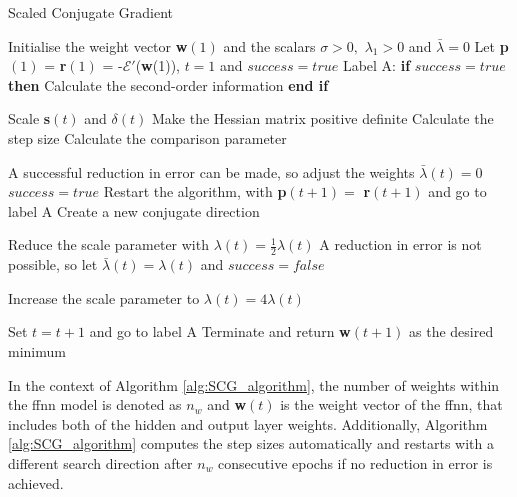 \documentclass[10pt, conference]{IEEEtran}
\begin{document}
\begin{algorithm}[H]
    \caption{Scaled Conjugate Gradient}
    \label{alg:SCG_algorithm}
    \begin{algorithmic}[1]
        \State Initialise the weight vector \textbf{w}$(1)$ and the scalars $\sigma > 0,$ $\lambda_1 > 0$ and $\bar{\lambda} = 0$
        \State Let \textbf{p}$(1)$ = \textbf{r}$(1)$ = -$\mathcal{E}'$(\textbf{w}(1)), $t = 1$ and $success = true$
        \State Label A: \textbf{if} $success = true$ \textbf{then}
            \State \quad Calculate the second-order information
        \State \textbf{end if}

        \State Scale \textbf{s}$(t)$ and $\delta(t)$
            \State Make the Hessian matrix positive definite
        \EndIf
        \State Calculate the step size
        \State Calculate the comparison parameter

            \State A successful reduction in error can be made, so adjust the weights
            \State $\bar{\lambda}(t) = 0$
            \State $success = true$
                \State Restart the algorithm, with \textbf{p}$(t+1) = $ \textbf{r}$(t+1)$ and go to label A
            \Else
                \State Create a new conjugate direction
            \EndIf

                \State Reduce the scale parameter with $\lambda(t) = \frac{1}{2}\lambda(t)$
            \EndIf
        \Else
            \State A reduction in error is not possible, so let $\bar{\lambda}(t) = \lambda(t)$ and $success = false$
        \EndIf

            \State Increase the scale parameter to $\lambda(t) = 4\lambda(t)$
        \EndIf

            \State Set $t = t+1$ and go to label A
        \Else
            \State Terminate and return \textbf{w}$(t+1)$ as the desired minimum
        \EndIf
    \end{algorithmic}
\end{algorithm}

In the context of Algorithm \ref{alg:SCG_algorithm}, the number of weights within the \acrshort{ffnn} model is
denoted as $n_w$ and \textbf{w}$(t)$ is the weight vector of the \acrshort{ffnn}, that includes both of the
hidden and output layer weights. Additionally, Algorithm \ref{alg:SCG_algorithm} computes the step sizes automatically and
restarts with a different search direction after $n_w$ consecutive epochs if no reduction in error is achieved.
\end{document}
